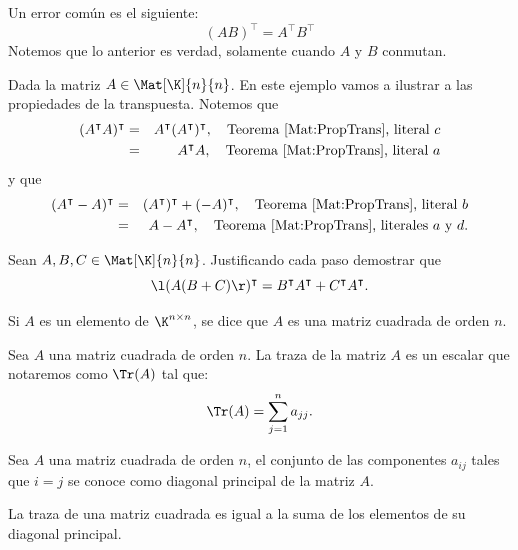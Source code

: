 \documentclass[compacto,10pt]{pubciencias-notas}
\begin{document}
\begin{advertencia}
Un error común es el siguiente:
\[
    (AB)^{\intercal} = A^{\intercal}B^{\intercal}
\]
Notemos que lo anterior es verdad, solamente cuando $A$ y $B$ conmutan.
\end{advertencia}

\begin{ejem}\hspace{0pt} Dada la matriz $A\in\Mat[\K]{n}{n}$. En este ejemplo vamos a ilustrar a las propiedades de la transpuesta. Notemos que
\begin{eqnarray*}
 (A^{\intercal}A)^{\intercal} &=& A^{\intercal}(A^{\intercal})^{\intercal}, \quad\text{Teorema \ref{Mat:PropTrans}, literal $c$} \\
 &=& A^{\intercal}A, \quad\text{Teorema \ref{Mat:PropTrans}, literal $a$} 
\end{eqnarray*}
y que
\begin{eqnarray*}
(A^{\intercal} - A)^{\intercal} &=& (A^{\intercal})^{\intercal} + (-A)^{\intercal}, \quad\text{Teorema \ref{Mat:PropTrans}, literal $b$} \\
&=& A - A^{\intercal}, \quad\text{Teorema \ref{Mat:PropTrans}, literales $a$ y $d$} .
\end{eqnarray*}
\end{ejem}

\begin{ejer}\hspace{0pt} Sean $A, B, C\in\Mat[\K]{n}{n}$. Justificando cada paso demostrar que 
\[\l(A(B + C)\r)^{\intercal} = B^{\intercal}A^{\intercal} + C^{\intercal}A^{\intercal}.\]
\end{ejer}

\begin{defi}
    Si $A$ es un elemento de $\K^{n \times n}$, se dice que $A$ es una matriz cuadrada de orden $n$.
\end{defi}

\begin{defi}\label{DefTraza}
Sea $A$ una matriz cuadrada de orden $n$. La traza de la matriz $A$ es un escalar que notaremos como $\Tr(A)$ tal que:
    \[ 
        \Tr(A) = \sum_{j=1}^n a_{jj}.
    \]
\end{defi}

\begin{advertencia}
    Sea $A$ una matriz cuadrada de orden $n$, el conjunto de las componentes $a_{ij}$ tales que $i=j$ se conoce como diagonal principal de la matriz $A$.
\end{advertencia}
\begin{advertencia}
    La traza de una matriz cuadrada es igual a la suma de los elementos de su diagonal principal. 
\end{advertencia}
\end{document}
